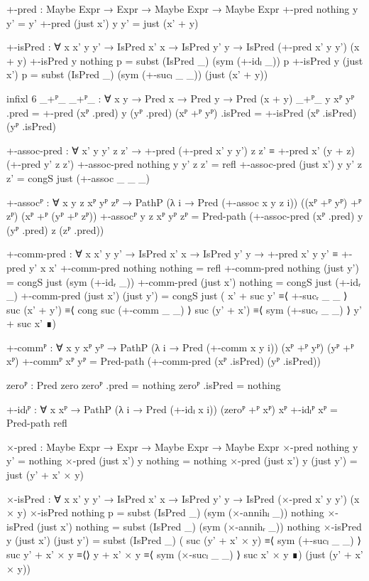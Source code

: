 \begin{code}[hide]
  +-pred : Maybe Expr → Expr → Maybe Expr → Maybe Expr
  +-pred nothing y y' = y'
  +-pred (just x') y y' = just (x' + y)

  +-isPred :
    ∀ {x x' y y'} →
    IsPred x' x → IsPred y' y → IsPred (+-pred x' y y') (x + y)
  +-isPred {y} nothing p = subst (IsPred _) (sym (+-idₗ _)) p
  +-isPred {y} (just x') p =
    subst (IsPred _) (sym (+-sucₗ _ _)) (just (x' + y))

  infixl 6 _+ᴾ_
  _+ᴾ_ : ∀ {x y} → Pred x → Pred y → Pred (x + y)
  _+ᴾ_ {y} xᴾ yᴾ .pred = +-pred (xᴾ .pred) y (yᴾ .pred)
  (xᴾ +ᴾ yᴾ) .isPred = +-isPred (xᴾ .isPred) (yᴾ .isPred)

  +-assoc-pred :
    ∀ x' y y' z z' →
    +-pred (+-pred x' y y') z z' ≡ +-pred x' (y + z) (+-pred y' z z')
  +-assoc-pred nothing y y' z z' = refl
  +-assoc-pred (just x') y y' z z' = congS just (+-assoc _ _ _)

  +-assocᴾ :
    ∀ {x y z} xᴾ yᴾ zᴾ →
    PathP (λ i → Pred (+-assoc x y z i)) ((xᴾ +ᴾ yᴾ) +ᴾ zᴾ) (xᴾ +ᴾ (yᴾ +ᴾ zᴾ))
  +-assocᴾ {y} {z} xᴾ yᴾ zᴾ =
    Pred-path (+-assoc-pred (xᴾ .pred) y (yᴾ .pred) z (zᴾ .pred))

  +-comm-pred :
    ∀ {x x' y y'} → IsPred x' x → IsPred y' y →
    +-pred x' y y' ≡ +-pred y' x x'
  +-comm-pred nothing nothing = refl
  +-comm-pred nothing (just y') = congS just (sym (+-idᵣ _))
  +-comm-pred (just x') nothing = congS just (+-idᵣ _)
  +-comm-pred (just x') (just y') =
    congS just
      ( x' + suc y'   ≡⟨ +-sucᵣ _ _ ⟩
        suc (x' + y') ≡⟨ cong suc (+-comm _ _) ⟩
        suc (y' + x') ≡⟨ sym (+-sucᵣ _ _) ⟩
        y' + suc x'   ∎)

  +-commᴾ :
    ∀ {x y} xᴾ yᴾ → PathP (λ i → Pred (+-comm x y i)) (xᴾ +ᴾ yᴾ) (yᴾ +ᴾ xᴾ)
  +-commᴾ xᴾ yᴾ = Pred-path (+-comm-pred (xᴾ .isPred) (yᴾ .isPred))

  zeroᴾ : Pred zero
  zeroᴾ .pred = nothing
  zeroᴾ .isPred = nothing

  +-idₗᴾ : ∀ {x} xᴾ → PathP (λ i → Pred (+-idₗ x i)) (zeroᴾ +ᴾ xᴾ) xᴾ
  +-idₗᴾ xᴾ = Pred-path refl

  ×-pred : Maybe Expr → Expr → Maybe Expr → Maybe Expr
  ×-pred nothing y y' = nothing
  ×-pred (just x') y nothing = nothing
  ×-pred (just x') y (just y') = just (y' + x' × y)

  ×-isPred :
    ∀ {x x' y y'} →
    IsPred x' x → IsPred y' y → IsPred (×-pred x' y y') (x × y)
  ×-isPred nothing p = subst (IsPred _) (sym (×-annihₗ _)) nothing
  ×-isPred (just x') nothing = subst (IsPred _) (sym (×-annihᵣ _)) nothing
  ×-isPred {y} (just x') (just y') =
    subst (IsPred _)
      ( suc (y' + x' × y) ≡⟨ sym (+-sucₗ _ _) ⟩
        suc y' + x' × y   ≡⟨⟩
        y + x' × y         ≡⟨ sym (×-sucₗ _ _) ⟩
        suc x' × y         ∎)
      (just (y' + x' × y))


\end{code}
